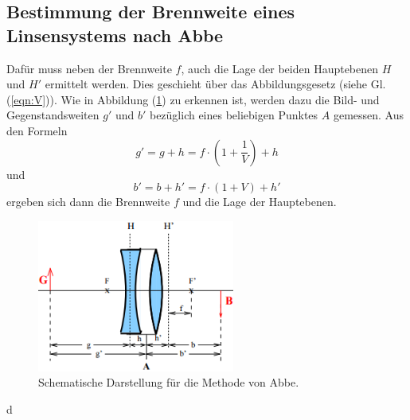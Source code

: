\subsection{Bestimmung der Brennweite eines Linsensystems nach Abbe}
Dafür muss neben der Brennweite $f$, auch die Lage der beiden Hauptebenen $H$ und $H'$ ermittelt werden. Dies geschieht über das Abbildungsgesetz (siehe Gl. (\ref{eqn:V})). Wie in Abbildung (\ref{fig:Abbe}) zu erkennen ist, werden dazu die Bild- und Gegenstandsweiten $g'$ und $b'$ bezüglich eines beliebigen Punktes $A$ gemessen. Aus den Formeln
\begin{equation}
	g' = g + h = f \cdot \left( 1 + \frac{1}{V} \right) + h
\end{equation}
und
\begin{equation}
	b' = b + h' = f \cdot (1 + V) + h'
\end{equation}
ergeben sich dann die Brennweite $f$ und die Lage der Hauptebenen.

\begin{figure}[H]
	\centering
	\includegraphics[height=5cm]{picture/Abbe}
	\caption{Schematische Darstellung für die Methode von Abbe.}
	\label{fig:Abbe}
\end{figure}













d
